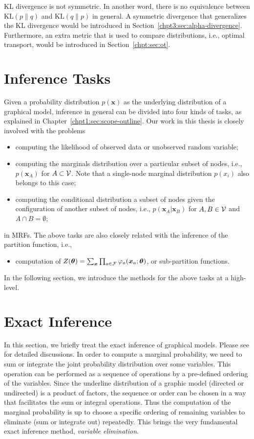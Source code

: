 KL divergence is not symmetric. In another word, there is no equivalence between $\mathrm{KL}(p\|q)$ and $\mathrm{KL}(q\|p)$ in general. A symmetric divergence that generalizes the KL divergence would be introduced in Section~\ref{chpt3:sec:alpha-divergence}. Furthermore, an extra metric that is used to compare distributions, i.e., optimal transport, would be introduced in Section~\ref{chpt:sec:ot}.



\section{Inference Tasks}


Given a probability distribution $p(\bm{x})$ as the underlying distribution of a graphical model, inference in general can be divided into four kinds of tasks, as explained in Chapter~\ref{chpt1:sec:scope-outline}. Our work in this thesis is closely involved with the problems
\begin{itemize}
\item computing the likelihood of observed data or unobserved random variable;
\item computing the marginals distribution over a particular subset of nodes, i.e., $p(\bm{x}_A)$ for $A \subset \mathcal{V}$. Note that a single-node marginal distribution $p(x_i)$ also belongs to this case;
\item computing the conditional distribution a subset of nodes given the configuration of another subset of nodes, i.e., $p(\bm{x}_A| \bm{x}_B)$ for $A, B \in \mathcal{V}$ and $A \cap B = \emptyset$;
\end{itemize}
in MRFs. The above tasks are also closely related with the inference of the partition function, i.e.,
\begin{itemize}
\item computation of $Z(\bm{\theta}) = \sum_{\bm{x}} \prod_{a \in \mathcal{F}} \varphi_{a}(\bm{x}_{a};\bm{\theta})$, or sub-partition functions.
\end{itemize}

In the following section, we introduce the methods for the above tasks at a high-level.

\section{Exact Inference}
\label{chpt2:sec:inference-mp}
In this section, we briefly treat the exact inference of graphical models. Please see \cite{Bishop:2006:PRM:1162264, koller2009pgm, yedida2005constucting, yedidia2003understanding} for detailed discussions. In order to compute a marginal probability, we need to sum or integrate the joint probability distribution over some variables. This operation can be performed as a sequence of operations by a pre-defined ordering of the variables. Since the underline distribution of a graphic model (directed or undirected) is a product of factors, the sequence or order can be chosen in a way that facilitates the sum or integral operations. Thus the computation of the marginal probability is up to choose a specific ordering of remaining variables to eliminate (sum or integrate out) repeatedly. This brings the very fundamental exact inference method, \textit{variable elimination}.

